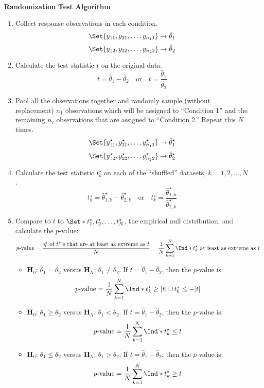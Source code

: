\begin{framed}
    \textbf{Randomization Test Algorithm}
    \begin{enumerate}
        \item Collect response observations in each condition.
              \[ \Set{y_{11},y_{21},\ldots,y_{n_1 1}}\to \hat{\theta}_1 \]
              \[ \Set{y_{12},y_{22},\ldots,y_{n_2 2}}\to \hat{\theta}_2 \]
        \item Calculate the test statistic $ t $ on the original data.
              \[ t=\hat{\theta}_1-\hat{\theta}_2\quad\text{or}\quad t=\frac{\hat{\theta}_1}{\hat{\theta}_2} \]
        \item Pool all the observations together and randomly sample (without replacement)
              $ n_1 $ observations which will be assigned to ``Condition 1'' and the remaining $ n_2 $
              observations that are assigned to ``Condition 2.'' Repeat this $ N $ times.
              \[ \Set{y_{11}^\star,y_{21}^\star,\ldots,y_{n_1 1}^\star}\to \hat{\theta}_1^\star \]
              \[ \Set{y_{12}^\star,y_{22}^\star,\ldots,y_{n_2 2}^\star}\to \hat{\theta}_2^\star \]
        \item Calculate the test statistic $ t_k^\star $ on each of the ``shuffled'' datasets, $ k=1,2,\ldots,N $.
              \[ t_k^\star=\hat{\theta}_{1,k}^\star-\hat{\theta}_{2,k}^\star\quad\text{or}\quad t_k^\star=\frac{\hat{\theta}_{1,k}^\star}{\hat{\theta}_{2,k}^\star}  \]
        \item Compare to $ t $ to $ \Set*{t_1^\star,t_2^\star,\ldots,t_N^\star} $, the empirical
              null distribution, and calculate the $ p $-value:
              \[ p\text{-value}=\frac{\text{\# of $t^\star$'s that are at least as extreme as $t$}}{N}=\frac{1}{N} \sum_{k=1}^{N} \Ind*{t_k^\star\text{ at least as extreme as $t$}}  \]
              \begin{itemize}
                  \item $ \mathbf{H}_0 $: $ \theta_1=\theta_2 $ versus $ \mathbf{H}_\text{A} $: $ \theta_1\ne \theta_2 $. If $ t=\hat{\theta}_1-\hat{\theta}_2 $, then
                        the $ p $-value is:
                        \[ p\text{-value}=\frac{1}{N} \sum_{k=1}^{N} \Ind*{t_k^\star\ge \abs{t}\cup t_k^\star\le -\abs{t}} \]
                  \item $ \mathbf{H}_0 $: $ \theta_1\ge \theta_2 $ versus $ \mathbf{H}_\text{A} $: $ \theta_1<\theta_2 $. If $ t=\hat{\theta}_1-\hat{\theta}_2 $, then
                        the $ p $-value is:
                        \[ p\text{-value}=\frac{1}{N} \sum_{k=1}^{N} \Ind*{t_k^\star\le t} \]
                  \item $ \mathbf{H}_0 $: $ \theta_1\le \theta_2 $ versus $ \mathbf{H}_\text{A} $: $ \theta_1>\theta_2 $. If $ t=\hat{\theta}_1-\hat{\theta}_2 $, then
                        the $ p $-value is:
                        \[ p\text{-value}=\frac{1}{N} \sum_{k=1}^{N} \Ind*{t_k^\star\ge t} \]
              \end{itemize}
    \end{enumerate}
\end{framed}
